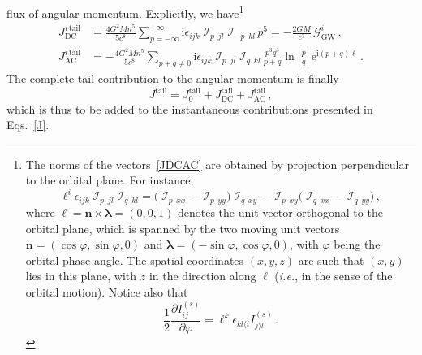 \documentclass[prd,preprint,superscriptaddress,tightenlines,nofootinbib,
  eqsecnum,showpacs]{revtex4}
\newcommand{\ui}{\mathrm{i}}
\newcommand{\ue}{\mathrm{e}}
\begin{document}
flux of angular momentum. Explicitly, we have\footnote{The norms of the vectors~\eqref{JDCAC} are obtained by projection perpendicular to the
  orbital plane. For instance,
%
\begin{equation*}
\ell^i\epsilon_{ijk}\mathop{{\mathcal{I}}}_{p}{}_{\!\!jl}
\mathop{{\mathcal{I}}}_{q}{}_{\!\!kl} =
\bigl(\mathop{{\mathcal{I}}}_{p}{}_{\!\!xx}-
\mathop{{\mathcal{I}}}_{p}{}_{\!\!yy}\bigr)\mathop{{\mathcal{I}}}_{q}{}_{\!\!xy}
- \mathop{{\mathcal{I}}}_{p}{}_{\!\!xy}
\bigl(\mathop{{\mathcal{I}}}_{q}{}_{\!\!xx}-
\mathop{{\mathcal{I}}}_{q}{}_{\!\!yy}\bigr)\,,
\end{equation*}
%
where $\bm{\ell}=\bm{n}\times\bm{\lambda} = (0,0,1)$ denotes the unit vector
orthogonal to the orbital plane, which is spanned by the two moving unit vectors
$\bm{n} = (\cos\varphi, \sin\varphi, 0)$ and
$\bm{\lambda} = (-\sin\varphi, \cos\varphi, 0)$, with $\varphi$ being the
orbital phase angle. The spatial coordinates $(x,y,z)$ are such that $(x,y)$
lies in this plane, with $z$ in the direction along $\bm{\ell}$
(\textit{i.e.}, in the sense of the orbital motion). Notice also that
%
\begin{equation*}
\frac{1}{2}\frac{\partial
  I_{ij}^{(s)}}{\partial \varphi} =
\ell^k\epsilon_{kl \langle i} I_{j \rangle l}^{(s)}\,.
\end{equation*}
%
}
%
\begin{subequations}\label{JDCAC}
\begin{align}
J_\text{DC}^{i\,\text{tail}} &= \frac{4 G^2M n^5}{5c^8} \sum_{p=-\infty}^{+\infty}
  \ui\epsilon_{ijk} \mathop{{\mathcal{I}}}_{p}{}_{\!\!jl}
  \mathop{{\mathcal{I}}}_{-p}{}_{\!\!kl}\,p^5 = -
\frac{2G M}{c^3}\,\mathcal{G}^i_\text{GW}\,,\\
J_\text{AC}^{i\,\text{tail}} &= - \frac{4 G^2M n^5}{5c^8} \sum_{p+q \not=
    0}\ui\epsilon_{ijk}\mathop{{\mathcal{I}}}_{p}{}_{\!\!jl}
  \mathop{{\mathcal{I}}}_{q}{}_{\!\!kl} \,\frac{p^3q^3}{p+q}
  \ln\left|\frac{p}{q}\right|\,\ue^{\ui(p+q)\ell}\,.
\end{align}
\end{subequations}
%
The complete tail contribution to the angular momentum is finally
%
\begin{equation}\label{Jtailthree}
J^\text{tail} = J_0^\text{tail} + J_\text{DC}^\text{tail} + J_\text{AC}^\text{tail}\,,
\end{equation}
%
which is thus to be added to the instantaneous contributions presented in
Eqs.~\eqref{J}.
\end{document}
